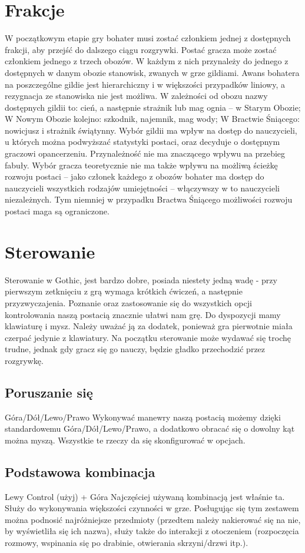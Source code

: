 \documentclass[11pt,polish, openany]{book}
\begin{document}
\section{Frakcje}
W początkowym etapie gry bohater musi zostać członkiem jednej z dostępnych frakcji, aby przejść do dalszego ciągu rozgrywki. Postać gracza może zostać członkiem jednego z trzech obozów. W każdym z nich przynależy do jednego z dostępnych w danym obozie stanowisk, zwanych w grze gildiami. Awans bohatera na poszczególne gildie jest hierarchiczny i w większości przypadków liniowy, a rezygnacja ze stanowiska nie jest możliwa. W zależności od obozu nazwy dostępnych gildii to: cień, a następnie strażnik lub mag ognia – w Starym Obozie; W Nowym Obozie kolejno: szkodnik, najemnik, mag wody; W Bractwie Śniącego: nowicjusz i strażnik świątynny. Wybór gildii ma wpływ na dostęp do nauczycieli, u których można podwyższać statystyki postaci, oraz decyduje o dostępnym graczowi opancerzeniu. Przynależność nie ma znaczącego wpływu na przebieg fabuły. Wybór gracza teoretycznie nie ma także wpływu na możliwą ścieżkę rozwoju postaci – jako członek każdego z obozów bohater ma dostęp do nauczycieli wszystkich rodzajów umiejętności – włączywszy w to nauczycieli niezależnych. Tym niemniej w przypadku Bractwa Śniącego możliwości rozwoju postaci maga są ograniczone.
\section{Sterowanie}
Sterowanie w Gothic, jest bardzo dobre, posiada niestety jedną wadę - przy pierwszym zetknięciu z grą wymaga krótkich ćwiczeń, a następnie przyzwyczajenia. Poznanie oraz zastosowanie się do wszystkich opcji kontrolowania naszą postacią znacznie ułatwi nam grę.
Do dyspozycji mamy klawiaturę i mysz. Należy uważać ją za dodatek, ponieważ gra pierwotnie miała czerpać jedynie z klawiatury. Na początku sterowanie może wydawać się trochę trudne, jednak gdy gracz się go nauczy, będzie gładko przechodzić przez rozgrywkę.
\subsection{Poruszanie się}
Góra/Dół/Lewo/Prawo
Wykonywać manewry naszą postacią możemy dzięki standardowemu Góra/Dół/Lewo/Prawo, a dodatkowo obracać się o dowolny kąt można myszą. Wszystkie te rzeczy da się skonfigurować w opcjach.
\subsection{Podstawowa kombinacja}
Lewy Control (użyj) + Góra
Najczęściej używaną kombinacją jest właśnie ta. Służy do wykonywania większości czynności w grze. Posługując się tym zestawem można podnosić najróżniejsze przedmioty (przedtem należy nakierować się na nie, by wyświetliła się ich nazwa), służy także do interakcji z otoczeniem (rozpoczęcia rozmowy, wspinania się po drabinie, otwierania skrzyni/drzwi itp.).
\end{document}
